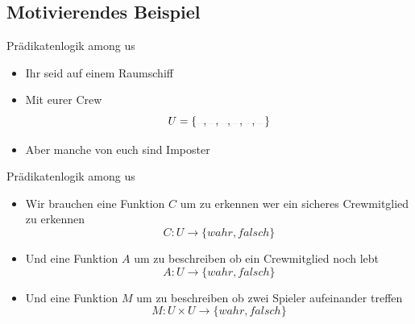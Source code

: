 \subsection{Motivierendes Beispiel}
\begin{frame}[fragile]{Prädikatenlogik among us}
	\begin{itemize}
		\item<1-> Ihr seid auf einem Raumschiff
		\item<2-> Mit eurer Crew
		      $$
			      U = \{\sus{red}, \sus{green}, \sus{blue}, \sus{white}, \sus{yellow}, \sus{magenta}\}
		      $$
		\item<3-> Aber manche von euch sind Imposter

	\end{itemize}
\end{frame}

\begin{frame}[fragile]{Prädikatenlogik among us}
	\begin{itemize}
		\item<1-> Wir brauchen eine Funktion $C$ um zu erkennen wer ein sicheres Crewmitglied zu erkennen
		      $$C: U \to \{wahr, falsch\}$$
		\item<2-> Und eine Funktion $A$ um zu beschreiben ob ein Crewmitglied noch lebt
		      $$A: U \to \{wahr, falsch\}$$
		\item<3-> Und eine Funktion $M$ um zu beschreiben ob zwei Spieler aufeinander treffen
		      $$M: U\times U \to \{wahr, falsch\}$$
	\end{itemize}
\end{frame}


